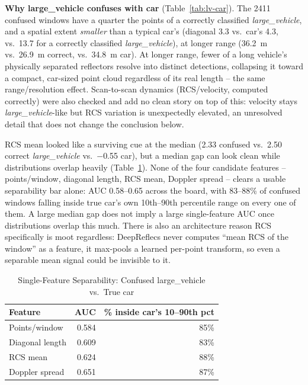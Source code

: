 \documentclass[10pt,letterpaper]{IEEEtran}
\begin{document}
\textbf{Why large\_vehicle confuses with car} (Table~\ref{tab:lv-car}). The
2411 confused windows have a quarter the points of a correctly classified
\emph{large\_vehicle}, and a spatial extent \emph{smaller} than a typical
car's (diagonal 3.3 vs.\ car's 4.3, vs.\ 13.7 for a correctly classified
\emph{large\_vehicle}), at longer range (36.2~m vs.\ 26.9~m correct, vs.\
34.8~m car). At longer range, fewer of a long vehicle's physically separated
reflectors resolve into distinct detections, collapsing it toward a compact,
car-sized point cloud regardless of its real length -- the same
range/resolution effect. Scan-to-scan dynamics (RCS/velocity, computed
correctly) were also checked and add no clean story on top of this: velocity
stays \emph{large\_vehicle}-like but RCS variation is unexpectedly elevated,
an unresolved detail that does not change the conclusion below.

RCS mean looked like a surviving cue at the median (2.33 confused vs.\ 2.50
correct \emph{large\_vehicle} vs.\ $-$0.55 car), but a median gap can look
clean while distributions overlap heavily (Table~\ref{tab:auc-rcs}). None of
the four candidate features -- points/window, diagonal length, RCS mean,
Doppler spread -- clears a usable separability bar alone: AUC 0.58--0.65
across the board, with 83--88\% of confused windows falling inside true
car's own 10th--90th percentile range on every one of them. A large median
gap does not imply a large single-feature AUC once distributions overlap
this much. There is also an architecture reason RCS specifically is moot
regardless: DeepReflecs never computes ``mean RCS of the window'' as a
feature, it max-pools a learned per-point transform, so even a separable
mean signal could be invisible to it.

\begin{table}[t]
  \centering
  \caption{Single-Feature Separability: Confused large\_vehicle vs.\ True car}
  \label{tab:auc-rcs}
  \begin{tabular}{lrr}
    \toprule
    Feature & AUC & \% inside car's 10--90th pct \\
    \midrule
    Points/window     & 0.584 & 85\% \\
    Diagonal length   & 0.609 & 83\% \\
    RCS mean          & 0.624 & 88\% \\
    Doppler spread    & 0.651 & 87\% \\
    \bottomrule
  \end{tabular}
\end{table}
\end{document}
